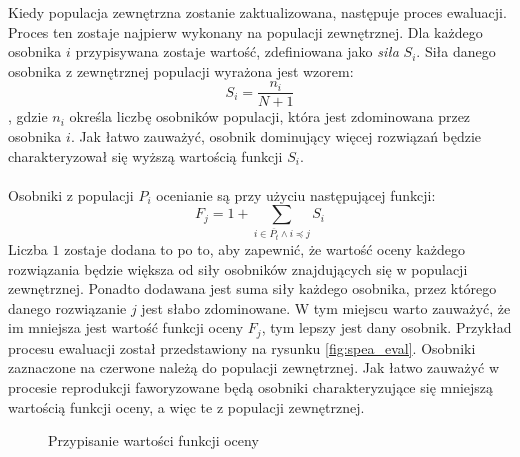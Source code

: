 \documentclass[twoside]{iisthesis}
\begin{document}
Kiedy populacja zewnętrzna zostanie zaktualizowana, następuje proces ewaluacji. Proces ten zostaje najpierw wykonany na populacji zewnętrznej. Dla każdego osobnika $i$ przypisywana zostaje wartość, zdefiniowana jako \textit{siła} $S_{i}$. Siła danego osobnika z zewnętrznej populacji wyrażona jest wzorem:
\begin{equation}\label{eq:str_ep}
	S_{i} = \dfrac{n_{i}}{N + 1}
\end{equation}
, gdzie $n_{i}$ określa liczbę osobników populacji, która jest zdominowana przez osobnika $i$. Jak łatwo zauważyć, osobnik dominujący więcej rozwiązań będzie charakteryzował się wyższą wartością funkcji $S_{i}$.\\\\
Osobniki z populacji $P_{i}$ ocenianie są przy użyciu następującej funkcji:
\begin{equation}\label{eq:str_p}
	F_{j} = 1 + \sum_{i \in \overline{P_{t}} \wedge i \preceq j} S_{i}
\end{equation}
Liczba $1$ zostaje dodana to po to, aby zapewnić, że wartość oceny każdego rozwiązania będzie większa od siły osobników znajdujących się w populacji zewnętrznej. Ponadto dodawana jest suma siły każdego osobnika, przez którego danego rozwiązanie $j$ jest słabo zdominowane. W tym miejscu warto zauważyć, że im mniejsza jest wartość funkcji oceny $F_{j}$, tym lepszy jest dany osobnik. Przykład procesu ewaluacji został przedstawiony na rysunku \eqref{fig:spea_eval}. Osobniki zaznaczone na czerwone należą do populacji zewnętrznej. Jak łatwo zauważyć w procesie reprodukcji faworyzowane będą osobniki charakteryzujące się mniejszą wartością funkcji oceny, a więc te z populacji zewnętrznej.
\begin{figure}[!htb]
	\centering
	\caption{Przypisanie wartości funkcji oceny}
	\label{fig:spea_eval}
\end{figure}
\end{document}

